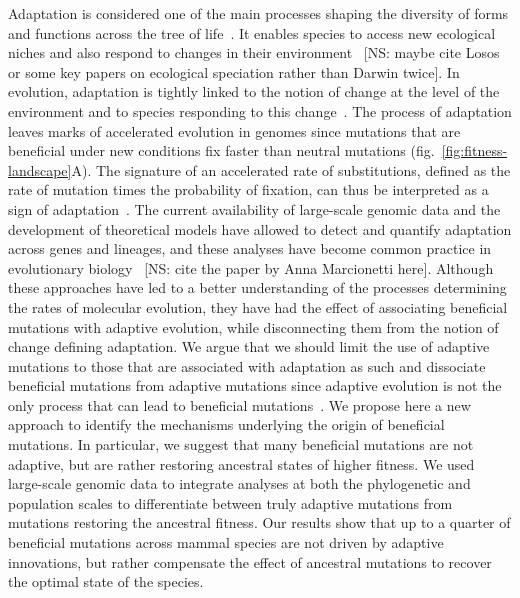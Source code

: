 \documentclass{article}
\begin{document}
    Adaptation is considered one of the main processes shaping the diversity of forms and functions across the tree of life~\cite{darwin_origin_1859}.
    It enables species to access new ecological niches and also respond to changes in their environment~\cite{darwin_origin_1859} [NS: maybe cite Losos or some key papers on ecological speciation rather than Darwin twice].
    In evolution, adaptation is tightly linked to the notion of change at the level of the environment and to species responding to this change~\cite{merrell_adaptive_1994}.
    The process of adaptation leaves marks of accelerated evolution in genomes since mutations that are beneficial under new conditions fix faster than neutral mutations (fig.~\ref{fig:fitness-landscape}A).
    The signature of an accelerated rate of substitutions, defined as the rate of mutation times the probability of fixation, can thus be interpreted as a sign of adaptation~\cite{mcdonald_adaptative_1991, smith_adaptive_2002, welch_estimating_2006}.
    The current availability of large-scale genomic data and the development of theoretical models have allowed to detect and quantify adaptation across genes and lineages, and these analyses have become common practice in evolutionary biology~\cite{yang_statistical_2000, eyre-walker_genomic_2006, moutinho_variation_2019} [NS: cite the paper by Anna Marcionetti here].
    Although these approaches have led to a better understanding of the processes determining the rates of molecular evolution, they have had the effect of associating beneficial mutations with adaptive evolution, while disconnecting them from the notion of change defining adaptation.
    We argue that we should limit the use of adaptive mutations to those that are associated with adaptation as such and dissociate beneficial mutations from adaptive mutations since adaptive evolution is not the only process that can lead to beneficial mutations~\cite{charlesworth_other_2007, mustonen_fitness_2009}.
    We propose here a new approach to identify the mechanisms underlying the origin of beneficial mutations.
    In particular, we suggest that many beneficial mutations are not adaptive, but are rather restoring ancestral states of higher fitness.
    We used large-scale genomic data to integrate analyses at both the phylogenetic and population scales to differentiate between truly adaptive mutations from mutations restoring the ancestral fitness.
    Our results show that up to a quarter of beneficial mutations across mammal species are not driven by adaptive innovations, but rather compensate the effect of ancestral mutations to recover the optimal state of the species.
\end{document}
